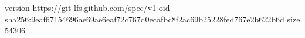 version https://git-lfs.github.com/spec/v1
oid sha256:9eaf67154696ae69ae6eaf72c767d0ecafbc8f2ac69b25228fed767e2b622b6d
size 54306
